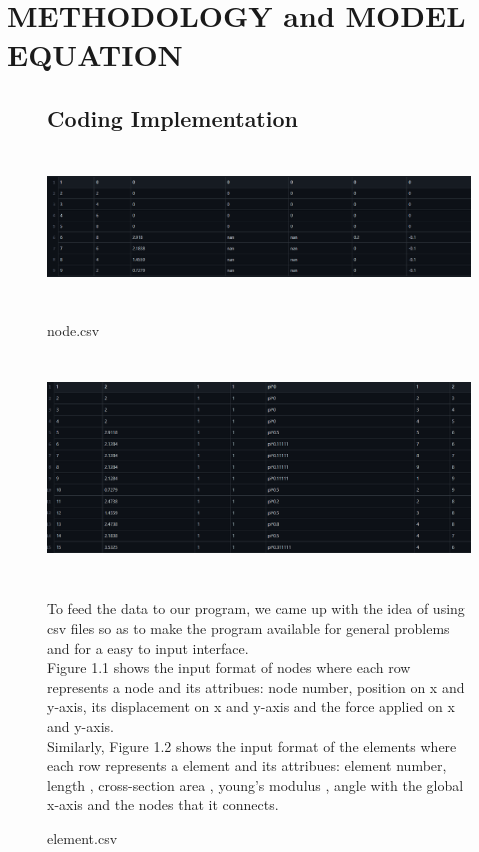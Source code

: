 \documentclass[a4paper,12pt]{report}
\begin{document}
\chapter{\bf{METHODOLOGY and MODEL EQUATION}}

\begin{figure}
\section{\bf Coding Implementation}\vspace{1cm}
\includegraphics[width=14cm, height=4cm]{node}
\caption{node.csv}
\vspace{0.7cm}
\includegraphics[width = 14cm, height = 6cm]{ele}
\caption{element.csv}
\vspace{0.7cm}
To feed the data to our program, we came up with the idea of using csv files so as to make the program available for general problems and for a easy to input interface.\\

Figure 1.1 shows the input format of nodes where each row represents a node and its attribues: node number, position on x and y-axis, its displacement on x and y-axis and the force applied on x and y-axis.\\

Similarly, Figure 1.2 shows the input format of the elements where each row represents a element and its attribues: element number, length , cross-section area , young's modulus , angle with the global x-axis and the nodes that it connects.
\end{figure}
\end{document}
